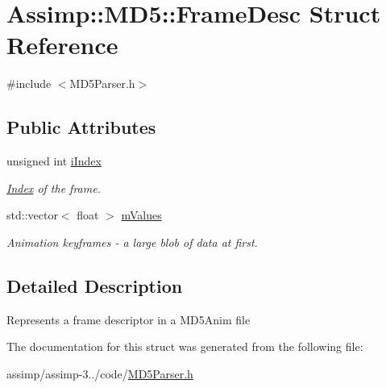 \hypertarget{struct_assimp_1_1_m_d5_1_1_frame_desc}{\section{Assimp\+:\+:M\+D5\+:\+:Frame\+Desc Struct Reference}
\label{struct_assimp_1_1_m_d5_1_1_frame_desc}
}


{\ttfamily \#include $<$M\+D5\+Parser.\+h$>$}

\subsection*{Public Attributes}
\begin{DoxyCompactItemize}
\item 
\hypertarget{struct_assimp_1_1_m_d5_1_1_frame_desc_af3314422eb532a6c8e8065d5f669b787}{unsigned int \hyperlink{struct_assimp_1_1_m_d5_1_1_frame_desc_af3314422eb532a6c8e8065d5f669b787}{i\+Index}}\label{struct_assimp_1_1_m_d5_1_1_frame_desc_af3314422eb532a6c8e8065d5f669b787}

\begin{DoxyCompactList}\small\item\em \hyperlink{struct_index}{Index} of the frame. \end{DoxyCompactList}\item 
\hypertarget{struct_assimp_1_1_m_d5_1_1_frame_desc_a4d7664b5c0f01b615d7e8609b82855ba}{std\+::vector$<$ float $>$ \hyperlink{struct_assimp_1_1_m_d5_1_1_frame_desc_a4d7664b5c0f01b615d7e8609b82855ba}{m\+Values}}\label{struct_assimp_1_1_m_d5_1_1_frame_desc_a4d7664b5c0f01b615d7e8609b82855ba}

\begin{DoxyCompactList}\small\item\em Animation keyframes -\/ a large blob of data at first. \end{DoxyCompactList}\end{DoxyCompactItemize}


\subsection{Detailed Description}
Represents a frame descriptor in a M\+D5\+Anim file 

The documentation for this struct was generated from the following file\+:\begin{DoxyCompactItemize}
\item 
assimp/assimp-\/3../code/\hyperlink{_m_d5_parser_8h}{M\+D5\+Parser.\+h}\end{DoxyCompactItemize}
